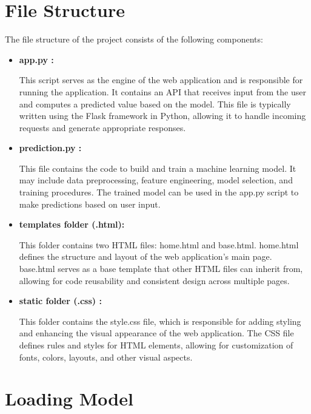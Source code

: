 \section{File Structure}

The file structure of the project consists of the following components:

\begin{itemize}
	\item \textbf {	app.py :}
	
	This script serves as the engine of the web application and is responsible for running the application.
	It contains an API that receives input from the user and computes a predicted value based on the model.
	This file is typically written using the Flask framework in Python, allowing it to handle incoming requests and generate appropriate responses.
	
	
	\item \textbf {	prediction.py :}
	
	This file contains the code to build and train a machine learning model.
	It may include data preprocessing, feature engineering, model selection, and training procedures.
	The trained model can be used in the app.py script to make predictions based on user input.
	
	
	\item \textbf {	templates folder (.html):}
	
	This folder contains two HTML files: home.html and base.html.
	home.html defines the structure and layout of the web application's main page.
	base.html serves as a base template that other HTML files can inherit from, allowing for code reusability and consistent design across multiple pages.
	
	
	\item \textbf {	static folder (.css) :}
	
	This folder contains the style.css file, which is responsible for adding styling and enhancing the visual appearance of the web application.
	The CSS file defines rules and styles for HTML elements, allowing for customization of fonts, colors, layouts, and other visual aspects.
	
	
	
	
\end{itemize}


\section{Loading Model}



